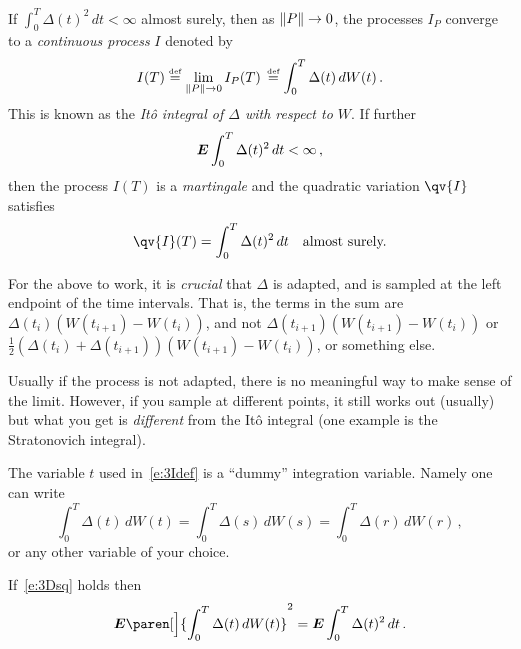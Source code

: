 \begin{theorem}\label{t:3ipconv}
  If $\int_0^T \Delta(t)^2 \, dt < \infty$ almost surely, then as $\lVert P\rVert \to 0$, the processes $I_P$ converge to a \emph{continuous process} $I$ denoted by
  \begin{equation}\label{e:3Idef}
    I(T)
      \stackrel{\scriptscriptstyle\textup{def}}{=} \lim_{\lVert P\rVert \to 0} I_P(T)\,
      \stackrel{\scriptscriptstyle\textup{def}}{=} \int_0^T \Delta(t) \, dW(t)\,.
  \end{equation}
  This is known as the \emph{It\^o integral of $\Delta$ with respect to $W$}.
  If further
  \begin{equation}\label{e:3Dsq}
    \bm{E} \int_0^T \Delta(t)^2 \, dt < \infty\,,
  \end{equation}
  then the process $I(T)$ is a \emph{martingale} and the quadratic variation $\qv{I}$ satisfies
  \begin{equation*}
    \qv{I}(T) = \int_0^T \Delta(t)^2 \, dt
    \quad\text{almost surely.}
  \end{equation*}
\end{theorem}

\begin{remark}
  For the above to work, it is \emph{crucial} that $\Delta$ is adapted, and is sampled at the left endpoint of the time intervals.
  That is, the terms in the sum are $\Delta(t_i) (W(t_{i+1}) - W(t_i))$, and not $\Delta(t_{i+1}) (W(t_{i+1}) - W(t_i))$ or $\frac{1}{2} (\Delta(t_i) + \Delta(t_{i+1})) (W(t_{i+1}) - W(t_i))$, or something else.

  Usually if the process is not adapted, there is no meaningful way to make sense of the limit.
  However, if you sample at different points, it still works out (usually) but what you get is \emph{different} from the It\^o integral (one example is the Stratonovich integral). 
\end{remark}

\begin{remark}
  The variable $t$ used in~\eqref{e:3Idef} is a ``dummy'' integration variable.
  Namely one can write
  \begin{equation*}
    \int_0^T \Delta(t) \, dW(t)
      = \int_0^T \Delta(s) \, dW(s)
      = \int_0^T \Delta(r) \, dW(r)
      \,,
  \end{equation*}
  or any other variable of your choice.
\end{remark}

\begin{corollary}[It\^o Isometry]
  If~\eqref{e:3Dsq} holds then
  \begin{equation*}
    \E \paren[\Big]{ \int_0^T \Delta(t) \, dW(t) }^2
      = \E \int_0^T \Delta(t)^2 \, dt\,.
  \end{equation*}
\end{corollary}

